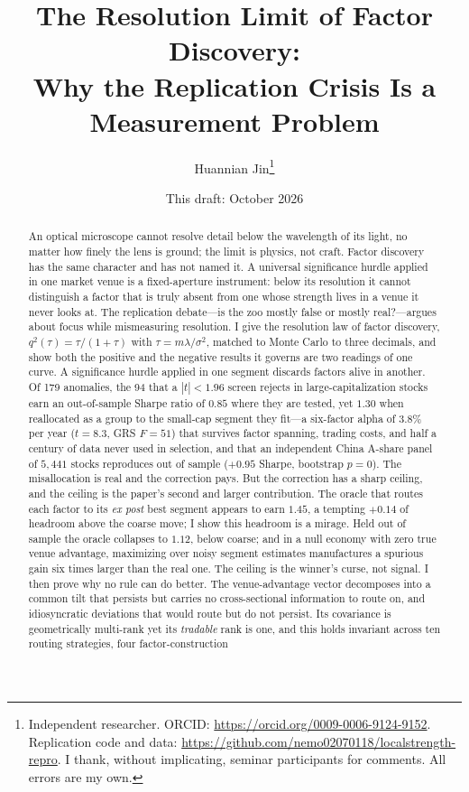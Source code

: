 \documentclass[12pt]{article}
\title{\textbf{The Resolution Limit of Factor Discovery:\\[2pt]
Why the Replication Crisis Is a Measurement Problem}}
\author{Huannian Jin\thanks{Independent researcher. ORCID:
\url{https://orcid.org/0009-0006-9124-9152}. Replication code and data:
\url{https://github.com/nemo02070118/localstrength-repro}. I thank, without
implicating, seminar participants for comments. All errors are my own.}}
\date{This draft: October 2026}
\theoremstyle{plain}
\theoremstyle{definition}
\begin{document}
\maketitle

\begin{abstract}
\noindent
An optical microscope cannot resolve detail below the wavelength of its light,
no matter how finely the lens is ground; the limit is physics, not craft. Factor
discovery has the same character and has not named it. A universal significance
hurdle applied in one market venue is a fixed-aperture instrument: below its
resolution it cannot distinguish a factor that is truly absent from one whose
strength lives in a venue it never looks at. The replication debate---is the zoo
mostly false or mostly real?---argues about focus while mismeasuring resolution.
I give the resolution law of factor discovery, $q^2(\tau)=\tau/(1+\tau)$ with
$\tau=m\lambda/\sigma^2$, matched to Monte Carlo to three decimals, and show both
the positive and the negative results it governs are two readings of one curve.
A significance hurdle applied in one segment discards factors alive in another.
Of 179 anomalies, the 94 that a $|t|<1.96$ screen rejects in
large-capitalization stocks earn an out-of-sample Sharpe ratio of $0.85$ where
they are tested, yet $1.30$ when reallocated as a group to the small-cap segment
they fit---a six-factor alpha of $3.8\%$ per year ($t=8.3$, GRS $F=51$) that
survives factor spanning, trading costs, and half a century of data never used
in selection, and that an independent China A-share panel of $5{,}441$ stocks
reproduces out of sample ($+0.95$ Sharpe, bootstrap $p=0$). The misallocation is
real and the correction pays. But the correction has a sharp ceiling, and the
ceiling is the paper's second and larger contribution. The oracle that routes each factor to its \emph{ex post} best
segment appears to earn $1.45$, a tempting $+0.14$ of headroom above the coarse
move; I show this headroom is a mirage. Held out of sample the oracle collapses
to $1.12$, below coarse; and in a null economy with zero true venue advantage,
maximizing over noisy segment estimates manufactures a spurious gain six times
larger than the real one. The ceiling is the winner's curse, not signal.
I then prove why no rule can do better. The venue-advantage vector decomposes
into a common tilt that persists but carries no cross-sectional information to
route on, and idiosyncratic deviations that would route but do not persist.
Its covariance is geometrically multi-rank yet its \emph{tradable} rank is one,
and this holds invariant across ten routing strategies, four factor-construction

\end{abstract}
\end{document}
